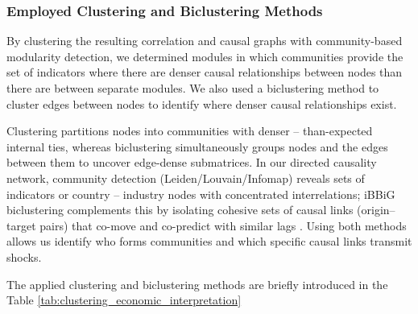 \documentclass[preprint, 3p,
authoryear]{elsarticle} %
\begin{document}
\subsubsection{Employed Clustering and Biclustering
Methods}\label{sec:clust}

By clustering the resulting correlation and causal graphs with
community-based modularity detection, we determined modules in which
communities provide the set of indicators where there are denser causal
relationships between nodes than there are between separate modules. We
also used a biclustering method to cluster edges between nodes to
identify where denser causal relationships exist.

Clustering partitions nodes into communities with denser --
than-expected internal ties, whereas biclustering simultaneously groups
nodes and the edges between them to uncover edge-dense submatrices. In
our directed causality network, community detection
(Leiden/Louvain/Infomap) reveals sets of indicators or country --
industry nodes with concentrated interrelations; iBBiG biclustering
complements \citep{pontes2015biclustering} this by isolating cohesive
sets of causal links (origin--target pairs) that co-move and co-predict
with similar lags \citep{castanho2024biclustering}. Using both methods
allows us identify who forms communities and which specific causal links
transmit shocks.

The applied clustering and biclustering methods are briefly introduced
in the Table \ref{tab:clustering_economic_interpretation}
\end{document}
